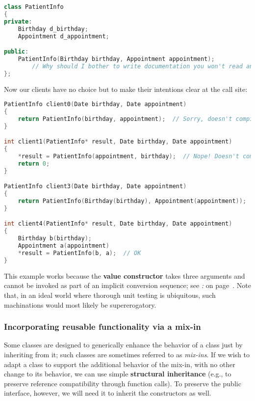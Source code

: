 \begin{lstlisting}[language=C++]
class PatientInfo
{
private:
    Birthday d_birthday;
    Appointment d_appointment;

public:
    PatientInfo(Birthday birthday, Appointment appointment);
        // Why should I bother to write documentation you won't read anyway!?
};
\end{lstlisting}
    
\noindent Now our clients have no choice but to make their intentions clear at the
call site:

\begin{lstlisting}[language=C++]
PatientInfo client0(Date birthday, Date appointment)
{
    return PatientInfo(birthday, appointment);  // Sorry, doesn't compile.
}

int client1(PatientInfo* result, Date birthday, Date appointment)
{
    *result = PatientInfo(appointment, birthday);  // Nope! Doesn't compile.
    return 0;
}

PatientInfo client3(Date birthday, Date appointment)
{
    return PatientInfo(Birthday(birthday), Appointment(appointment));  // OK
}

int client4(PatientInfo* result, Date birthday, Date appointment)
{
    Birthday b(birthday);
    Appointment a(appointment)
    *result = PatientInfo(b, a);  // OK
}
\end{lstlisting}
    
\noindent This example works because the \textbf{value constructor} takes three
arguments and cannot be invoked as part of an implicit conversion
sequence; see \textit{: } on page~\pageref{beware-of-inheriting-implicit-constructors}. Note that, in an ideal
world where thorough unit testing is ubiquitous, such machinations would
most likely be supererogatory.

\subsubsection[Incorporating reusable functionality via a mix-in]{Incorporating reusable functionality via a mix-in}\label{incorporating-reusable-functionality-via-a-mix-in-class}

Some classes are designed to generically enhance the behavior of a class
just by inheriting from it; such classes are sometimes referred to as
\emph{mix-ins}. If we wish to adapt a class to support the additional
behavior of the mix-in, with no other change to its behavior, we can use
simple \textbf{structural inheritance} (e.g., to preserve reference
compatibility through function calls). To preserve the public interface,
however, we will need it to inherit the constructors as well.

